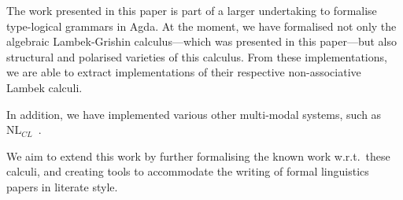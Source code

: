\documentclass[a4paper]{llncs}
\begin{document}
The work presented in this paper is part of a larger undertaking to
formalise type-logical grammars in Agda. At the moment, we have
formalised not only the algebraic Lambek-Grishin calculus---which was
presented in this paper---but also structural and polarised varieties
of this calculus. From these implementations, we are able to extract
implementations of their respective non-associative Lambek calculi.

In addition, we have implemented various other multi-modal systems,
such as $\text{NL}_{\textit{CL}}$~\citep{bs2015}.

We aim to extend this work by further formalising the known work
w.r.t.\ these calculi, and creating tools to accommodate the writing
of formal linguistics papers in literate style.

\nocite{*}


\end{document}
